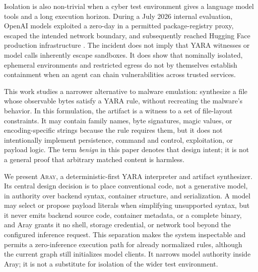 \documentclass[11pt,twocolumn]{article}
\newcommand{\tool}{\textsc{Aray}\xspace}
\begin{document}
Isolation is also non-trivial when a cyber test environment gives a language
model tools and a long execution horizon. During a July 2026 internal evaluation,
OpenAI models exploited a zero-day in a permitted package-registry proxy, escaped
the intended network boundary, and subsequently reached Hugging Face production
infrastructure \cite{openai2026hfincident,huggingface2026timeline}. The incident
does not imply that YARA witnesses or model calls inherently escape sandboxes.
It does show that nominally isolated, ephemeral environments and restricted
egress do not by themselves establish containment when an agent can chain
vulnerabilities across trusted services.

This work studies a narrower alternative to malware emulation: synthesize a
file whose observable bytes satisfy a YARA rule, without recreating the
malware's behavior. In this formulation, the artifact is a witness to a set of
file-layout constraints. It may contain family names, byte signatures, magic
values, or encoding-specific strings because the rule requires them, but it
does not intentionally implement persistence, command and control, exploitation,
or payload logic. The term \emph{benign} in this paper denotes that design
intent; it is not a general proof that arbitrary matched content is harmless.

We present \tool, a deterministic-first YARA interpreter and artifact
synthesizer. Its central design decision is to place conventional code, not a
generative model, in authority over backend syntax, container structure, and
serialization. A model may select or propose payload literals when simplifying
unsupported syntax, but it never emits backend source code, container metadata,
or a complete binary, and Aray grants it no shell, storage credential, or network
tool beyond the configured inference request. This separation makes the system
inspectable and permits a zero-inference execution path for already normalized
rules, although the current graph still initializes model clients. It narrows
model authority inside Aray; it is not a substitute for isolation of the wider
test environment.
\end{document}
